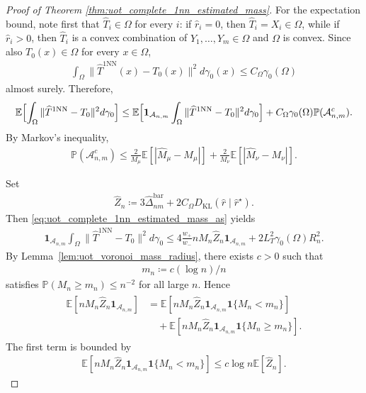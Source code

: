 \documentclass[11pt,reqno]{amsart}
\theoremstyle{definition}
\newcommand{\KL}{\mathrm{KL}}
\renewcommand{\hat}{\widehat}
\newcommand{\Ep}{\mathbb{E}}
\begin{document}
\begin{proof}[Proof of Theorem \ref{thm:uot_complete_1nn_estimated_mass}]
For the expectation bound, note first that $\hat T_i\in\Omega$ for every $i$:
if $\hat r_i=0$, then $\hat T_i=X_i\in\Omega$, while if $\hat r_i>0$, then $\hat T_i$ is a convex combination of $Y_1,\dots,Y_m\in\Omega$ and $\Omega$ is convex.
Since also $T_0(x)\in\Omega$ for every $x\in\Omega$,
\begin{align}
    \int_\Omega \|\hat T^{\mathrm{1NN}}(x)-T_0(x)\|^2  d\gamma_0(x)
    \le
    C_\Omega \gamma_0(\Omega)
\end{align}
almost surely.
Therefore,
\begin{align}
\label{eq:uot_complete_1nn_estimated_mass_expect_split}
    \Ep\Bigl[
        \int_\Omega \|\hat T^{\mathrm{1NN}}-T_0\|^2  d\gamma_0
    \Bigr]
    \le
    \Ep\Bigl[
        \mathbf{1}_{\mathcal{A}_{n,m}}
        \int_\Omega \|\hat T^{\mathrm{1NN}}-T_0\|^2  d\gamma_0
    \Bigr]
    + C_\Omega \gamma_0(\Omega)\mathbb{P}(\mathcal{A}_{n,m}^c).
\end{align}
By Markov's inequality,
\begin{align}
\label{eq:uot_complete_1nn_estimated_mass_badmass_prob}
    \mathbb{P}(\mathcal{A}_{n,m}^c)
    \le
    \frac{2}{M_\mu}\Ep[|\hat M_\mu-M_\mu|]
    +
    \frac{2}{M_\nu}\Ep[|\hat M_\nu-M_\nu|].
\end{align}

Set
\begin{align}
    \hat Z_n
    \coloneqq
    3\hat\Delta_{nm}^{\mathrm{bar}}
    +2C_\Omega {D_\KL}(\hat r\mid \hat r^\star).
\end{align}
Then \eqref{eq:uot_complete_1nn_estimated_mass_as} yields
\begin{align}
\label{eq:uot_complete_1nn_estimated_mass_Z}
    \mathbf{1}_{\mathcal{A}_{n,m}}
    \int_\Omega \|\hat T^{\mathrm{1NN}}-T_0\|^2  d\gamma_0
    \le
    4\frac{w_+}{w_-}  nM_n \hat Z_n \mathbf{1}_{\mathcal{A}_{n,m}}
    + 2L_T^2\gamma_0(\Omega)R_n^2.
\end{align}
By Lemma~\ref{lem:uot_voronoi_mass_radius}, there exists $c>0$ such that
\begin{align}
    m_n \coloneqq c{(\log n)/n}
\end{align}
satisfies $\mathbb{P}(M_n\ge m_n)\le n^{-2}$ for all large $n$.
Hence
\begin{align}
\label{eq:uot_complete_1nn_estimated_mass_Mn_split}
\begin{aligned}
    \Ep[nM_n \hat Z_n \mathbf{1}_{\mathcal{A}_{n,m}}]
    &=
    \Ep[nM_n \hat Z_n \mathbf{1}_{\mathcal{A}_{n,m}}\mathbf{1}\{M_n<m_n\}] \\
    &\quad
    +
    \Ep[nM_n \hat Z_n \mathbf{1}_{\mathcal{A}_{n,m}}\mathbf{1}\{M_n\ge m_n\}].
\end{aligned}
\end{align}
The first term is bounded by
\begin{align}
\label{eq:uot_complete_1nn_estimated_mass_smallcells}
    \Ep[nM_n \hat Z_n \mathbf{1}_{\mathcal{A}_{n,m}}\mathbf{1}\{M_n<m_n\}]
    \le
    c\log n \Ep[\hat Z_n].
\end{align}


\end{proof}
\end{document}
